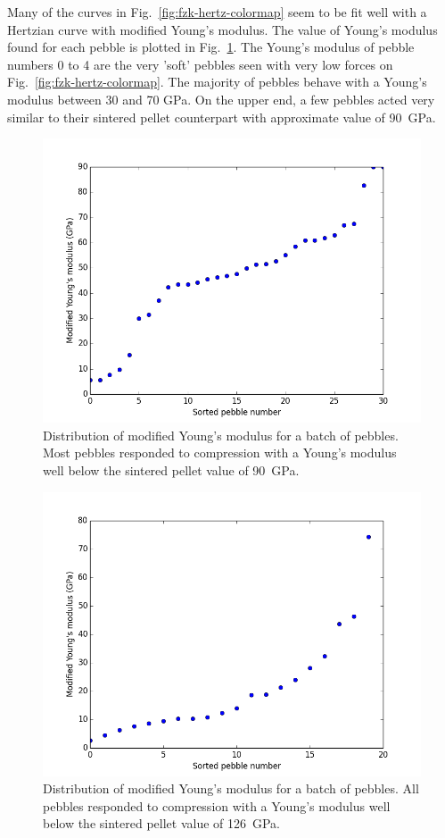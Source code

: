 Many of the curves in Fig.~\ref{fig:fzk-hertz-colormap} seem to be fit well with a Hertzian curve with modified Young's modulus. The value of Young's modulus found for each pebble is plotted in Fig.~\ref{fig:fzk-E-plot}. The Young's modulus of pebble numbers 0 to 4 are the very 'soft' pebbles seen with very low forces on Fig.~\ref{fig:fzk-hertz-colormap}. The majority of pebbles behave with a Young's modulus between 30 and 70 \si{GPa}. On the upper end, a few pebbles acted very similar to their sintered pellet counterpart with approximate value of \si{90 GPa}.

\begin{figure}[ht!]
\centering
\includegraphics[width = 0.75 \textwidth]{chapters/figures/fzk-E-plot}
\caption{Distribution of modified Young's modulus for a batch of \lis pebbles. Most pebbles responded to compression with a Young's modulus well below the sintered pellet value of \si{90 GPa}.}\label{fig:fzk-E-plot}
\end{figure}

\begin{figure}[ht!]
\centering
\includegraphics[width = 0.75 \textwidth]{chapters/figures/nfri-E-plot}
\caption{Distribution of modified Young's modulus for a batch of \lit pebbles. All pebbles responded to compression with a Young's modulus well below the sintered pellet value of \si{126 GPa}.}\label{fig:nfri-E-plot}
\end{figure}


